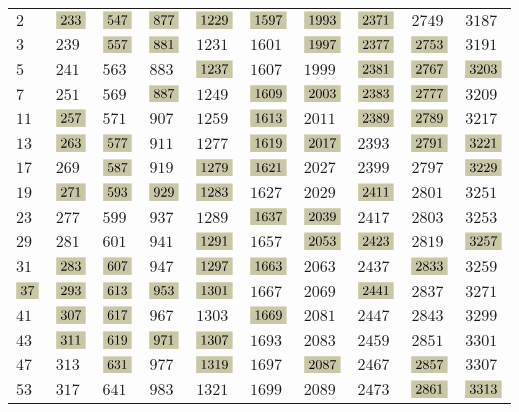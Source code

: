 \documentclass{article}
\numberwithin{equation}{section}
\newcommand{\highlight}[1]{\colorbox{shadecolor}{$\displaystyle #1$}}
\theoremstyle{definition}
\begin{document}
\begin{center}
  {\footnotesize
    \begin{tabular}{x{1cm}x{1cm}x{1cm}x{1cm}x{1cm}x{1cm}x{1cm}x{1cm}x{1cm}x{1cm}}
      $2$ & $\highlight{233}$ & $\highlight{547}$ & $\highlight{877}$ & $\highlight{1229}$ & $\highlight{1597}$ & $\highlight{1993}$ & $\highlight{2371}$ & $2749$ & $3187$ \tabularnewline
      $3$ & $239$ & $\highlight{557}$ & $\highlight{881}$ & $1231$ & $1601$ & $\highlight{1997}$ & $\highlight{2377}$ & $\highlight{2753}$ & $3191$ \tabularnewline
      $5$ & $241$ & $563$ & $883$ & $\highlight{1237}$ & $1607$ & $1999$ & $\highlight{2381}$ & $\highlight{2767}$ & $\highlight{3203}$ \tabularnewline
$7$ & $251$ & $569$ & $\highlight{887}$ & $1249$ & $\highlight{1609}$ & $\highlight{2003}$ & $\highlight{2383}$ & $\highlight{2777}$ & $3209$ \tabularnewline
      $11$ & $\highlight{257}$ & $571$ & $907$ & $1259$ & $\highlight{1613}$ & $2011$ & $\highlight{2389}$ & $\highlight{2789}$ & $3217$ \tabularnewline
      $13$ & $\highlight{263}$ & $\highlight{577}$ & $911$ & $1277$ & $\highlight{1619}$ & $\highlight{2017}$ & $2393$ & $\highlight{2791}$ & $\highlight{3221}$ \tabularnewline
      $17$ & $269$ & $\highlight{587}$ & $919$ & $\highlight{1279}$ & $\highlight{1621}$ & $2027$ & $2399$ & $2797$ & $\highlight{3229}$ \tabularnewline
      $19$ & $\highlight{271}$ & $\highlight{593}$ & $\highlight{929}$ & $\highlight{1283}$ & $1627$ & $2029$ & $\highlight{2411}$ & $2801$ & $3251$ \tabularnewline
      $23$ & $277$ & $599$ & $937$ & $1289$ & $\highlight{1637}$ & $\highlight{2039}$ & $2417$ & $2803$ & $3253$ \tabularnewline
$29$ & $281$ & $601$ & $941$ & $\highlight{1291}$ & $1657$ & $\highlight{2053}$ & $\highlight{2423}$ & $2819$ & $\highlight{3257}$ \tabularnewline
      $31$ & $\highlight{283}$ & $\highlight{607}$ & $947$ & $\highlight{1297}$ & $\highlight{1663}$ & $2063$ & $2437$ & $\highlight{2833}$ & $3259$ \tabularnewline
      $\highlight{37}$ & $\highlight{293}$ & $\highlight{613}$ & $\highlight{953}$ & $\highlight{1301}$ & $1667$ & $2069$ & $\highlight{2441}$ & $2837$ & $3271$ \tabularnewline
      $41$ & $\highlight{307}$ & $\highlight{617}$ & $967$ & $1303$ & $\highlight{1669}$ & $2081$ & $2447$ & $2843$ & $3299$ \tabularnewline
      $43$ & $\highlight{311}$ & $\highlight{619}$ & $\highlight{971}$ & $\highlight{1307}$ & $1693$ & $2083$ & $2459$ & $2851$ & $3301$ \tabularnewline
      $47$ & $313$ & $\highlight{631}$ & $977$ & $\highlight{1319}$ & $1697$ & $\highlight{2087}$ & $2467$ & $\highlight{2857}$ & $3307$ \tabularnewline
      $53$ & $317$ & $641$ & $983$ & $1321$ & $1699$ & $2089$ & $2473$ & $\highlight{2861}$ & $\highlight{3313}$ \tabularnewline

\end{tabular}}
\end{center}
\end{document}
